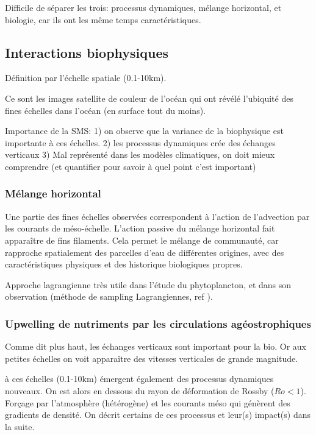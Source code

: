 \documentclass[master]{subfiles}
\begin{document}
Difficile de séparer les trois: processus dynamiques, mélange horizontal, et biologie, car ils ont les même temps caractéristiques.

\subsection{Interactions biophysiques}
\label{sec:interactions-biophys}

Définition par l'échelle spatiale (0.1-10km).

Ce sont les images satellite de couleur de l'océan qui ont révélé l'ubiquité des fines échelles dans l'océan (en surface tout du moins).

Importance de la SMS:
1) on observe que la variance de la biophysique est importante à ces échelles.
2) les processus dynamiques crée des échanges verticaux
3) Mal représenté dans les modèles climatiques, on doit mieux comprendre (et quantifier pour savoir à quel point c'est important)


\subsubsection{Mélange horizontal}
\label{sec:melange-horizontal}

Une partie des fines échelles observées correspondent à l'action de l'advection par les courants de méso-échelle. L'action passive du mélange horizontal fait apparaître de fins filaments.
Cela permet le mélange de communauté, car rapproche spatialement des parcelles d'eau de différentes origines, avec des caractéristiques physiques et des historique biologiques propres.

Approche lagrangienne très utile dans l'étude du phytoplancton, et dans son observation (méthode de sampling Lagrangiennes, ref ).


\subsubsection{Upwelling de nutriments par les circulations agéostrophiques}
\label{sec:upwelling-nutriments}

Comme dit plus haut, les échanges verticaux sont important pour la bio.
Or aux petites échelles on voit apparaître des vitesses verticales de grande magnitude.

à ces échelles (0.1-10km) émergent également des processus dynamiques nouveaux.
On est alors en dessous du rayon de déformation de Rossby (\(Ro < 1\)).
Forçage par l'atmosphère (hétérogène) et les courants méso qui génèrent des gradients de densité.
On décrit certains de ces processus et leur(s) impact(s) dans la suite.
\end{document}
